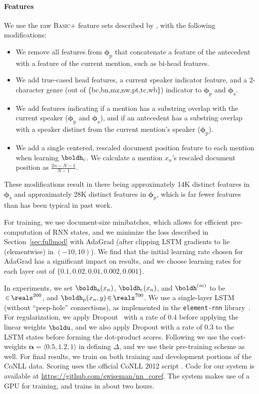 \documentclass[11pt,letterpaper]{article}
\newcommand{\ua}{\ensuremath{\mathrm{a}}}
\newcommand{\up}{\ensuremath{\mathrm{p}}}
\newcommand{\ha}{\boldh_{\ua}}
\newcommand{\hp}{\boldh_{\up}}
\newcommand{\aphi}{\boldsymbol{\phi}_{\mathrm{a}}}
\newcommand{\pwphi}{\boldsymbol{\phi}_{\mathrm{p}}}
\newcommand{\nicein}{\ensuremath{\,{\in}\,}}
\newcommand{\uc}{\ensuremath{\mathrm{c}}}
\newcommand{\hc}{\boldh_{\uc}}
\begin{document}
\paragraph{Features} We use the raw \textsc{Basic+} feature sets described by , with the following modifications:
\begin{itemize}
\item We remove all features from $\pwphi$ that concatenate a feature of the antecedent with a feature of the current mention, such as bi-head features.
\item We add true-cased head features, a current speaker indicator feature, and a 2-character genre (out of \{bc,bn,mz,nw,pt,tc,wb\}) indicator to $\pwphi$ and $\aphi$.
\item We add features indicating if a mention has a substring overlap with the current speaker ($\pwphi$ and $\aphi$), and if an antecedent has a substring overlap with a speaker distinct from the current mention's speaker ($\pwphi$).
\item We add a single centered, rescaled document position feature to each mention when learning $\hc$. We calculate a mention $x_n$'s rescaled document position as $\frac{2n-N-1}{N-1}$. 
\end{itemize}
These modifications result in there being approximately 14K distinct features in $\aphi$ and approximately 28K distinct features in $\pwphi$, which is far fewer features than has been typical in past work.

For training, we use document-size minibatches, which allows for efficient pre-computation of RNN states, and we minimize the loss described in Section~\ref{sec:fullmod} with AdaGrad \cite{duchi2011adaptive} (after clipping LSTM gradients to lie (elementwise) in $(-10,10)$). We find that the initial learning rate chosen for AdaGrad has a significant impact on results, and we choose learning rates for each layer out of $\{0.1,0.02,0.01,0.002,0.001\}$. 

In experiments, we set $\ha(x_n)$, $\hc(x_n)$, and $\boldh^{(m)}$ to be $\nicein \reals^{200}$, and $\hp(x_n,y) \nicein \reals^{700}$. We use a single-layer LSTM (without ``peep-hole'' connections), as implemented in the \texttt{element-rnn} library~\cite{elements}. For regularization, we apply Dropout~\cite{srivastava2014dropout} with a rate of 0.4 before applying the linear weights $\boldu$, and we also apply Dropout with a rate of 0.3 to the LSTM states before forming the dot-product scores. Following  we use the cost-weights $\boldsymbol{\alpha} = \langle 0.5, 1.2, 1 \rangle$ in defining $\Delta$, and we use their pre-training scheme as well. For final results, we train on both training and development portions of the CoNLL data. Scoring uses the official CoNLL 2012 script
\cite{pradhan2014scoring,luo2014extension}.  
Code for our system is available at \url{https://github.com/swiseman/nn_coref}. The system makes use of a GPU for training, and trains in about two hours.
 
\end{document}
